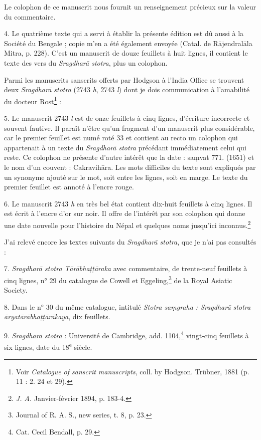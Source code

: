 \documentclass[a4paper, 11pt, oneside, french]{article}
\begin{document}
Le colophon de ce manuscrit nous fournit un renseignement précieux sur la valeur du commentaire.

4. Le quatrième texte qui a servi à établir la présente édition est dû aussi à la Société du Bengale ; copie m'en a été également envoyée (Catal. de R\={a}jendral\={a}la Mitra, p. 228). C'est un manuscrit de douze feuillets à huit lignes, il contient le texte des vers du \emph{Sragdhar\={a} stotra}, plus un colophon.

Parmi les manuscrits sanscrits offerts par Hodgson à l'India Office se trouvent deux \emph{Sragdhar\={a} stotra} (2743 \emph{h}, 2743 \emph{l}) dont je dois communication à l'amabilité du docteur Rost\footnote{Voir \emph{Catalogue of sanscrit manuscripts}, coll. by Hodgson. Trübner, 1881 (p. 11 : 2. 24 et 29).} :

5. Le manuscrit 2743 \emph{l} est de onze feuillets à cinq lignes, d'écriture incorrecte et souvent fautive. Il paraît n'être qu'un fragment d'un manuscrit plus considérable, car le premier feuillet est numé roté 33 et contient au recto un colophon qui appartenait à un texte du \emph{Sragdhar\={a} stotra} précédant immédiatement celui qui reste. Ce colophon ne présente d'autre intérêt que la date : sa\d{m}vat 771. (1651) et le nom d'un couvent : Cakravih\={a}ra. Les mots difficiles du texte sont expliqués par un synonyme ajouté sur le mot, soit entre les lignes, soit en marge. Le texte du premier feuillet est annoté à l'encre rouge.

6. Le manuscrit 2743 \emph{h} en très bel état contient dix-huit feuillets à cinq lignes. Il est écrit à l'encre d'or sur noir. Il offre de l'intérêt par son colophon qui donne une date nouvelle pour l'histoire du Népal et quelques noms jusqu'ici inconnus.\footnote{\emph{J. A.} Janvier-février 1894, p. 183-4.}

J'ai relevé encore les textes suivants du \emph{Sragdhar\={a} stotra}, que je n'ai pas consultés :

7. \emph{Sragdhar\={a} stotra T\={a}r\={a}bha\d{t}\d{t}\={a}raka} avec commentaire, de trente-neuf feuillets à cinq lignes, n° 29 du catalogue de Cowell et Eggeling,\footnote{Journal of R. A. S., new series, t. 8, p. 23.} de la Royal Asiatic Society.

8. Dans le n° 30 du même catalogue, intitulé \emph{Stotra sa\d{m}graha : Sragdhar\={a} stotra \={a}ryat\={a}r\={a}bha\d{t}\d{t}\={a}r\={a}kaya}, dix feuillets.

9. \emph{Sragdhar\={a} stotra} : Université de Cambridge, add. 1104,\footnote{Cat. Cecil Bendall, p. 29.} vingt-cinq feuillets à six lignes, date du 18\textsuperscript{e} siècle.
\end{document}
